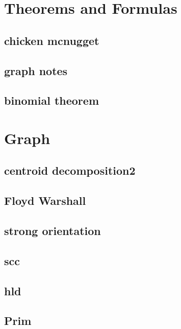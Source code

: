 \section{Theorems and Formulas}
\subsection{chicken mcnugget}
\raggedbottom
\hrulefill
\subsection{graph notes}
\raggedbottom
\hrulefill
\subsection{binomial theorem}
\raggedbottom
\hrulefill

\section{Graph}
\subsection{centroid decomposition2}
\raggedbottom
\hrulefill
\subsection{Floyd Warshall}
\raggedbottom
\hrulefill
\subsection{strong orientation}
\raggedbottom
\hrulefill
\subsection{scc}
\raggedbottom
\hrulefill
\subsection{hld}
\raggedbottom
\hrulefill
\subsection{Prim}
\raggedbottom
\hrulefill
